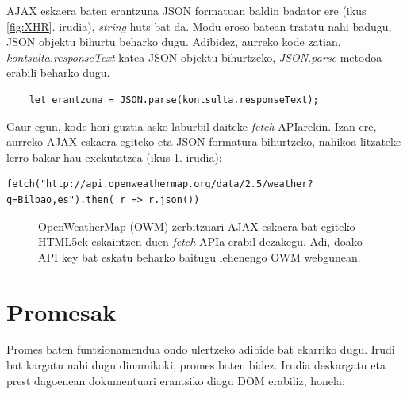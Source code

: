 AJAX eskaera baten erantzuna JSON formatuan baldin badator ere (ikus \ref{fig:XHR}. irudia), \textit{string} huts bat da. Modu eroso batean tratatu nahi badugu, JSON objektu bihurtu beharko dugu.
Adibidez, aurreko kode zatian, \textit{kontsulta.responseText} katea JSON objektu bihurtzeko, \textit{JSON.parse} metodoa erabili beharko dugu.

\begin{verbatim}
    let erantzuna = JSON.parse(kontsulta.responseText);
\end{verbatim}

Gaur egun, kode hori guztia asko laburbil daiteke \textit{fetch} APIarekin. Izan ere, aurreko AJAX eskaera egiteko eta JSON formatura bihurtzeko, nahikoa litzateke lerro bakar hau exekutatzea (ikus \ref{fig:fetchAPI}. irudia):

\begin{verbatim}
fetch("http://api.openweathermap.org/data/2.5/weather?
q=Bilbao,es").then( r => r.json())
\end{verbatim}


\begin{figure}[ht]
	\centering
{}
\caption{OpenWeatherMap (OWM) zerbitzuari AJAX eskaera bat egiteko HTML5ek eskaintzen duen \textit{fetch} APIa erabil dezakegu. Adi, doako API key bat eskatu beharko baitugu lehenengo OWM webgunean.}
\label{fig:fetchAPI}
\end{figure}

\section{Promesak}
Promes baten funtzionamendua ondo ulertzeko adibide bat ekarriko dugu. Irudi bat kargatu nahi dugu dinamikoki, promes baten bidez. Irudia deskargatu eta prest dagoenean dokumentuari erantsiko diogu DOM erabiliz, honela:

